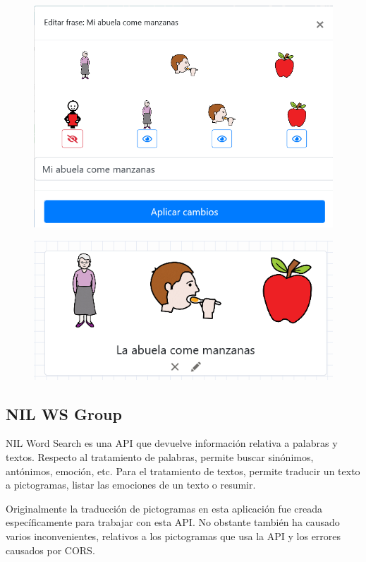 \begin{figure}[h!]
	\centering
	\includegraphics[width=0.7\linewidth]{Imagenes/Bitmap/modalEditarFraseItem}
	\caption{}
	\label{fig:modaleditarfraseitem}
\end{figure}

\begin{figure}[h!]
	\centering
	\includegraphics[width=0.7\linewidth]{Imagenes/Bitmap/fraseItemMidificada}
	\caption{}
	\label{fig:fraseitemmidificada}
\end{figure}


\subsection{NIL WS Group}

NIL Word Search es una API que devuelve información relativa a palabras y textos. Respecto al tratamiento de palabras, permite buscar sinónimos, antónimos, emoción, etc. Para el tratamiento de textos, permite  traducir un texto a pictogramas, listar las emociones de un texto o resumir. 

Originalmente la traducción de pictogramas en esta aplicación fue creada específicamente para trabajar con esta API. No obstante también ha causado varios inconvenientes, relativos a los pictogramas que usa la API y los errores causados por CORS. 

